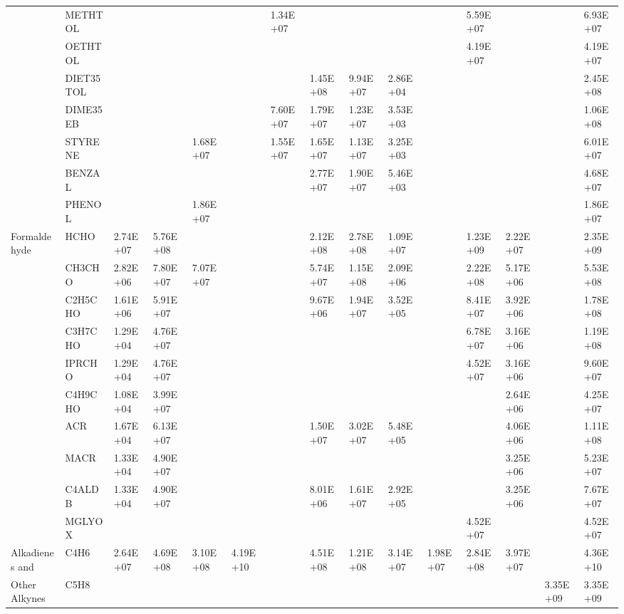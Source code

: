 \begin{longtable}{lllllllllllllll}
	 & METHTOL &  &  &  &  & 1.34E+07 &  &  &  &  & 5.59E+07 &  &  & 6.93E+07 \\
	 & OETHTOL &  &  &  &  &  &  &  &  &  & 4.19E+07 &  &  & 4.19E+07 \\
	 & DIET35TOL &  &  &  &  &  & 1.45E+08 & 9.94E+07 & 2.86E+04 &  &  &  &  & 2.45E+08 \\
	 & DIME35EB &  &  &  &  & 7.60E+07 & 1.79E+07 & 1.23E+07 & 3.53E+03 &  &  &  &  & 1.06E+08 \\
	 & STYRENE &  &  & 1.68E+07 &  & 1.55E+07 & 1.65E+07 & 1.13E+07 & 3.25E+03 &  &  &  &  & 6.01E+07 \\
	 & BENZAL &  &  &  &  &  & 2.77E+07 & 1.90E+07 & 5.46E+03 &  &  &  &  & 4.68E+07 \\
	 & PHENOL &  &  & 1.86E+07 &  &  &  &  &  &  &  &  &  & 1.86E+07 \\
	\hline Formaldehyde & HCHO & 2.74E+07 & 5.76E+08 &  &  &  & 2.12E+08 & 2.78E+08 & 1.09E+07 &  & 1.23E+09 & 2.22E+07 &  & 2.35E+09 \\ \hline
	\parbox[t]{2mm}{} & CH3CHO & 2.82E+06 & 7.80E+07 & 7.07E+07 &  &  & 5.74E+07 & 1.15E+08 & 2.09E+06 &  & 2.22E+08 & 5.17E+06 &  & 5.53E+08 \\
	 & C2H5CHO & 1.61E+06 & 5.91E+07 &  &  &  & 9.67E+06 & 1.94E+07 & 3.52E+05 &  & 8.41E+07 & 3.92E+06 &  & 1.78E+08 \\
	 & C3H7CHO & 1.29E+04 & 4.76E+07 &  &  &  &  &  &  &  & 6.78E+07 & 3.16E+06 &  & 1.19E+08 \\
	 & IPRCHO & 1.29E+04 & 4.76E+07 &  &  &  &  &  &  &  & 4.52E+07 & 3.16E+06 &  & 9.60E+07 \\
	 & C4H9CHO & 1.08E+04 & 3.99E+07 &  &  &  &  &  &  &  &  & 2.64E+06 &  & 4.25E+07 \\
	 & ACR & 1.67E+04 & 6.13E+07 &  &  &  & 1.50E+07 & 3.02E+07 & 5.48E+05 &  &  & 4.06E+06 &  & 1.11E+08 \\
	 & MACR & 1.33E+04 & 4.90E+07 &  &  &  &  &  &  &  &  & 3.25E+06 &  & 5.23E+07 \\
	 & C4ALDB & 1.33E+04 & 4.90E+07 &  &  &  & 8.01E+06 & 1.61E+07 & 2.92E+05 &  &  & 3.25E+06 &  & 7.67E+07 \\
	 & MGLYOX &  &  &  &  &  &  &  &  &  & 4.52E+07 &  &  & 4.52E+07 \\
	\hline Alkadienes and & C4H6 & 2.64E+07 & 4.69E+08 & 3.10E+08 & 4.19E+10 &  & 4.51E+08 & 1.21E+08 & 3.14E+07 & 1.98E+07 & 2.84E+08 & 3.97E+07 &  & 4.36E+10 \\
	Other Alkynes & C5H8 &  &  &  &  &  &  &  &  &  &  &  & 3.35E+09 & 3.35E+09 \\

\end{longtable}
